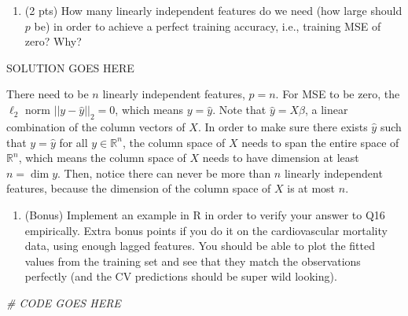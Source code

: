 \documentclass[
]{article}
\newenvironment{Shaded}{\begin{snugshade}}{\end{snugshade}}
\newcommand{\CommentTok}[1]{\textcolor[rgb]{0.56,0.35,0.01}{\textit{#1}}}
\providecommand{\tightlist}{%
  \setlength{\itemsep}{0pt}\setlength{\parskip}{0pt}}
\begin{document}
\begin{enumerate}
\def\labelenumi{\arabic{enumi}.}
\setcounter{enumi}{15}
\tightlist
\item
  (2 pts) How many linearly independent features do we need (how large
  should \(p\) be) in order to achieve a perfect training accuracy,
  i.e., training MSE of zero? Why?
\end{enumerate}

SOLUTION GOES HERE

There need to be \(n\) linearly independent features, \(p=n\). For MSE
to be zero, the \(\ell_2\) norm \(||y - \hat{y}||_2 = 0\), which means
\(y = \hat{y}\). Note that \(\hat{y} = X \hat{\beta}\), a linear
combination of the column vectors of \(X\). In order to make sure there
exists \(\hat{y}\) such that \(y = \hat{y}\) for all
\(y\in \mathbb{R}^n\), the column space of \(X\) needs to span the
entire space of \(\mathbb{R}^n\), which means the column space of \(X\)
needs to have dimension at least \(n = \dim y\). Then, notice there can
never be more than \(n\) linearly independent features, because the
dimension of the column space of \(X\) is at most \(n\).

\begin{enumerate}
\def\labelenumi{\arabic{enumi}.}
\setcounter{enumi}{16}
\tightlist
\item
  (Bonus) Implement an example in R in order to verify your answer to
  Q16 empirically. Extra bonus points if you do it on the cardiovascular
  mortality data, using enough lagged features. You should be able to
  plot the fitted values from the training set and see that they match
  the observations perfectly (and the CV predictions should be super
  wild looking).
\end{enumerate}

\begin{Shaded}
\begin{Highlighting}[]
\CommentTok{\# CODE GOES HERE}
\end{Highlighting}
\end{Shaded}
\end{document}
